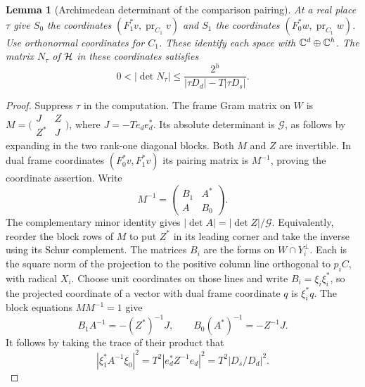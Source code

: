 \documentclass[a4paper,11pt]{article}
\newtheorem{lemma}[proposition]{Lemma}
\theoremstyle{definition}
\theoremstyle{remark}
\numberwithin{equation}{section}
\begin{document}
\begin{lemma}[Archimedean determinant of the comparison pairing]\leavevmode
\label{lem:archdet303}
At a real place \(\tau\) give \(S_0\) the coordinates
\((F_1^*v,\operatorname{pr}_{C_1}v)\) and \(S_1\) the coordinates
\((F_0^*w,\operatorname{pr}_{C_1}w)\). Use orthonormal
coordinates for \(C_1\). These identify each space with
\(\mathbb C^d\oplus\mathbb C^h\). The matrix \(N_\tau\) of \({\cal H}\)
in these coordinates satisfies
\[
     0<|\det N_\tau|\le
          \frac{2^h}{|\tau D_d|-T|\tau D_s|}.
\]
\end{lemma}
\begin{proof}
Suppress \(\tau\) in the computation. The frame Gram matrix on
\(W\) is \(M=\bigl(\begin{smallmatrix}J&Z\\ Z^*&J\end{smallmatrix}\bigr)\),
where \(J=-T e_de_d^*\). Its absolute determinant is \(\mathcal G\),
as follows by expanding in the two rank-one diagonal blocks.
Both \(M\) and \(Z\) are invertible. In dual frame coordinates
\((F_0^*v,F_1^*v)\) its pairing matrix is \(M^{-1}\), proving
the coordinate assertion. Write
\[
            M^{-1}=\begin{pmatrix}B_1&A^*\\ A&B_0\end{pmatrix}.
\]
The complementary minor identity gives
\(|\det A|=|\det Z|/\mathcal G\). Equivalently, reorder the
block rows of \(M\) to put \(Z^*\) in its leading corner
and take the inverse using its Schur complement.
The matrices \(B_i\) are the forms on \(W\cap Y_i^\perp\).
Each is the square norm of the projection to the positive
column line orthogonal to \(p_i C\), with radical \(X_i\).
Choose unit coordinates on those lines and write
\(B_i=\xi_i\xi_i^*\), so the projected coordinate of a
vector with dual frame coordinate \(q\) is \(\xi_i^*q\).
The block equations \(MM^{-1}=1\) give
\[
      B_1 A^{-1}=-(Z^*)^{-1}J,\qquad
      B_0(A^*)^{-1}=-Z^{-1}J .
\]
It follows by taking the trace of their product that
\[
      |\xi_1^* A^{-1}\xi_0|^2
       =T^2|e_d^* Z^{-1} e_d|^2=T^2|D_s/D_d|^2 .
\]


\end{proof}
\end{document}

